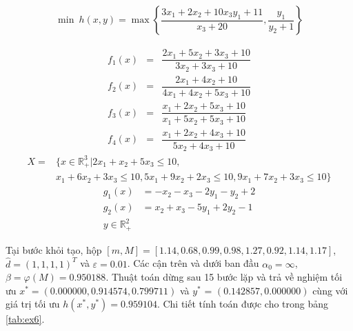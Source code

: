 \begin{vd}
\noindent  \label{ex:ex6}
\begin{align*}
    \min \ h(x,y) = \max \left\{ \dfrac{3x_1 + 2x_2 +10x_3y_1 +11}{x_3 + 20} ,\dfrac{y_1}{y_2+1} \right\} 
\end{align*} 

\[
\begin{array}{ccl}
    f_1(x) & = & \dfrac{2x_{1}+5x_{2}+3x_{3}+10}{3x_{2}+3x_{3}+10} \\
    f_2(x) & = & \dfrac{2x_{1}+4x_{2}+10}{4x_{1}+4x_{2}+5x_{3}+10} \\
    f_3(x) & = & \dfrac{x_{1}+2x_{2}+5x_{3}+10}{x_{1}+5x_{2}+5x_{3}+10}\\
    f_4(x) & = & \dfrac{x_{1}+2x_{2}+4x_{3}+10}{5x_{2}+4x_{3}+10}
\end{array}
\]
\begin{align*}
    X = &\{ x \in \mathbb{R}^3_+ \vert 2x_{1}+x_{2}+5x_{3} \leq 10,\\
     &x_{1}+6x_{2}+3x_{3} \leq 10, 5x_{1}+9x_{2}+2x_{3} \leq 10, 9x_{1}+7x_{2}+3x_{3} \leq 10\} 
\end{align*}
\[
\begin{array}{ccl}
    g_1(x) &= -x_2 -x_3-2y_1 -y_2 + 2   \\
     g_2(x)&= x_2 + x_3 -5y_1 +2y_2 - 1 \\
     y \in \mathbb{R}^2_+
\end{array}
\]
\end{vd}

Tại bước khỏi tạo, hộp $[m,M] =[1.14,0.68,0.99,0.98,1.27,0.92,1.14,1.17]$, $\hat{d}=(1, 1, 1, 1)^{T}$ và $\varepsilon=0.01$. Các cận trên và dưới ban đầu $\alpha_{0}=\infty$, $\beta=\varphi(M)=0.950188$.
Thuật toán dừng sau 15 bước lặp và trả về nghiệm tối ưu $x^{*}= (0.000000, 0.914574,  0.799711)$ và $y^*$ = $(0.142857, 0.000000)$ cùng với giá trị tối ưu $h(x^{*}, y^*)= 0.959104$. Chi tiết tính toán được cho trong bảng \ref{tab:ex6}.

